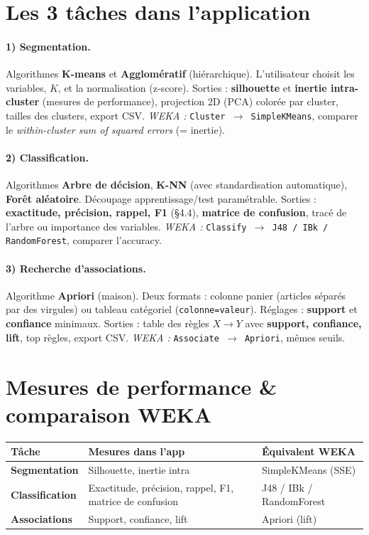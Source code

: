 \section{Les 3 tâches dans l'application}

\paragraph{1) Segmentation.} Algorithmes \textbf{K-means} et \textbf{Agglomératif}
(hiérarchique). L'utilisateur choisit les variables, $K$, et la normalisation (z-score).
Sorties : \textbf{silhouette} et \textbf{inertie intra-cluster} (mesures de performance),
projection 2D (PCA) colorée par cluster, tailles des clusters, export CSV.
\emph{WEKA :} \texttt{Cluster $\rightarrow$ SimpleKMeans}, comparer le \emph{within-cluster
sum of squared errors} (= inertie).

\paragraph{2) Classification.} Algorithmes \textbf{Arbre de décision}, \textbf{K-NN}
(avec standardisation automatique), \textbf{Forêt aléatoire}. Découpage
apprentissage/test paramétrable. Sorties : \textbf{exactitude, précision, rappel, F1}
(\S4.4), \textbf{matrice de confusion}, tracé de l'arbre ou importance des variables.
\emph{WEKA :} \texttt{Classify $\rightarrow$ J48 / IBk / RandomForest}, comparer l'accuracy.

\paragraph{3) Recherche d'associations.} Algorithme \textbf{Apriori} (maison). Deux formats :
colonne \og panier \fg{} (articles séparés par des virgules) ou tableau catégoriel
(\texttt{colonne=valeur}). Réglages : \textbf{support} et \textbf{confiance} minimaux. Sorties :
table des règles $X\to Y$ avec \textbf{support, confiance, lift}, top règles, export CSV.
\emph{WEKA :} \texttt{Associate $\rightarrow$ Apriori}, mêmes seuils.

\section{Mesures de performance \& comparaison WEKA}
\begin{center}\small
\renewcommand{\arraystretch}{1.25}
\begin{tabular}{>{\bfseries}l p{5.4cm} p{5.4cm}}
\toprule
Tâche & Mesures dans l'app & Équivalent WEKA\\
\midrule
Segmentation & Silhouette, inertie intra & SimpleKMeans (SSE)\\
Classification & Exactitude, précision, rappel, F1, matrice de confusion & J48 / IBk / RandomForest\\
Associations & Support, confiance, lift & Apriori (lift)\\
\bottomrule
\end{tabular}
\end{center}

